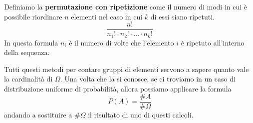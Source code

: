 \begin{definition}
	Definiamo la \textbf{permutazione con ripetizione} come il numero di modi in cui è possibile
	riordinare $n$ elementi nel caso in cui $k$ di essi siano ripetuti.
	\[ \frac{n!}{n_1! \cdot n_2! \cdot ... \cdot n_k!} \]
	In questa formula $n_i$ è il numero di volte che l'elemento $i$ è ripetuto all'interno della
	sequenza.
\end{definition}

Tutti questi metodi per contare gruppi di elementi servono a sapere quanto vale la cardinalità di
$\Omega$. Una volta che la si conosce, se ci troviamo in un caso di distribuzione uniforme di
probabilità, allora possiamo applicare la formula
\[ P(A) = \frac{\# A}{\# \Omega} \]
andando a sostituire a $\# \Omega$ il risultato di uno di questi calcoli.
